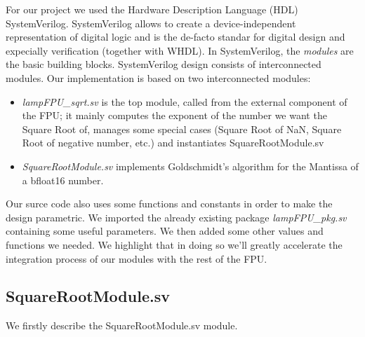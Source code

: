 For our project we used the Hardware Description Language (HDL) SystemVerilog. SystemVerilog allows to create a device-independent representation of digital logic and is the de-facto standar for digital design and expecially verification (together with WHDL). 
In SystemVerilog, the \emph{modules} are the basic building blocks. SystemVerilog design consists of interconnected modules.
Our implementation is based on two interconnected modules:

\begin{itemize}
\item \emph{lampFPU\_sqrt.sv} is the top module, called from the external component of the FPU; it mainly computes the exponent of the number we want the Square Root of, manages some special cases (Square Root of NaN, Square Root of negative number, etc.) and instantiates SquareRootModule.sv
\item \emph{SquareRootModule.sv} implements Goldschmidt's algorithm for the Mantissa of a bfloat16 number. 
\end{itemize}

Our surce code also uses some functions and constants in order to make the design parametric. We imported the already existing package \emph{lampFPU\_pkg.sv} containing some useful parameters. We then added some other values and functions we needed. We highlight that in doing so we'll greatly accelerate the integration process of our modules with the rest of the FPU. 

\subsection{SquareRootModule.sv}
We firstly describe the SquareRootModule.sv module. 
%

